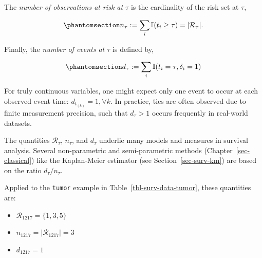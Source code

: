 \documentclass[
  letterpaper,
  krantz2]{style/krantz}
\providecommand{\tightlist}{%
  \setlength{\itemsep}{0pt}\setlength{\parskip}{0pt}}
\begin{document}
The \emph{number of observations at risk at
\(\tau\)} is the cardinality of the risk set at
\(\tau\),

\begin{equation}\phantomsection\label{eq-risk-set-n}{
n_\tau := \sum_i \mathbb{I}(t_i \geq \tau) = \vert \mathcal{R}_\tau \vert.
}\end{equation}

Finally, the \emph{number of events at \(\tau\)}
is defined by,

\begin{equation}\phantomsection\label{eq-risk-set-d}{
d_\tau := \sum_i \mathbb{I}(t_i = \tau, \delta_i = 1)
}\end{equation}

For truly continuous variables, one might expect only one event to occur
at each observed event time: \(d_{t_{(k)}} = 1,\forall k\). In practice,
ties are often observed due to finite measurement precision,
such that \(d_{\tau} > 1\) occurs frequently in real-world datasets.

The quantities \(\mathcal{R}_\tau\), \(n_\tau\), and \(d_\tau\) underlie
many models and measures in survival analysis. Several
non-parametric and
semi-parametric methods
(Chapter~\ref{sec-classical}) like the
Kaplan-Meier estimator (see
Section~\ref{sec-surv-km}) are based on the ratio \(d_\tau / n_\tau\).

Applied to the \texttt{tumor} example in
Table~\ref{tbl-surv-data-tumor}, these quantities are:

\begin{itemize}
\tightlist
\item
  \(\mathcal{R}_{1217} = \{1, 3, 5\}\)
\item
  \(n_{1217} = \vert \mathcal{R}_{1217} \vert = 3\)
\item
  \(d_{1217} = 1\)
\end{itemize}
\end{document}
